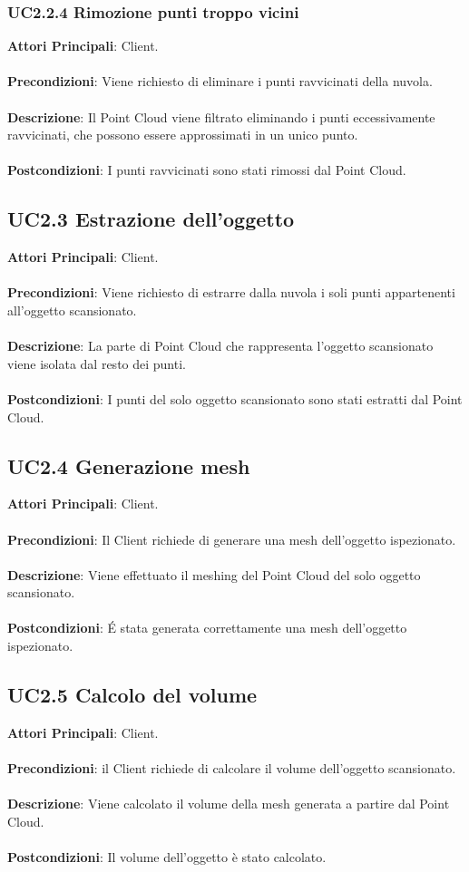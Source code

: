 \subsubsection{UC2.2.4 Rimozione punti troppo vicini}
\textbf{Attori Principali}: Client.
\\\\ \textbf{Precondizioni}: Viene richiesto di eliminare i punti ravvicinati della nuvola.
\\\\ \textbf{Descrizione}: Il Point Cloud viene filtrato eliminando i punti eccessivamente ravvicinati, che possono essere approssimati in un unico punto.
\\\\ \textbf{Postcondizioni}: I punti ravvicinati sono stati rimossi dal Point Cloud.

\subsection{UC2.3 Estrazione dell'oggetto}
\textbf{Attori Principali}: Client.
\\\\ \textbf{Precondizioni}: Viene richiesto di estrarre dalla nuvola i soli punti appartenenti all'oggetto scansionato.
\\\\ \textbf{Descrizione}: La parte di Point Cloud che rappresenta l'oggetto scansionato viene isolata dal resto dei punti.
\\\\ \textbf{Postcondizioni}: I punti del solo oggetto scansionato sono stati estratti dal Point Cloud.

\subsection{UC2.4 Generazione mesh}
\textbf{Attori Principali}: Client.
\\\\ \textbf{Precondizioni}: Il Client richiede di generare una mesh dell'oggetto ispezionato.
\\\\ \textbf{Descrizione}: Viene effettuato il meshing del Point Cloud del solo oggetto scansionato.
\\\\ \textbf{Postcondizioni}: \'E stata generata correttamente una mesh dell'oggetto ispezionato.

\subsection{UC2.5 Calcolo del volume}
\textbf{Attori Principali}: Client.
\\\\ \textbf{Precondizioni}: il Client richiede di calcolare il volume dell'oggetto scansionato.
\\\\ \textbf{Descrizione}: Viene calcolato il volume della mesh generata a partire dal Point Cloud.
\\\\ \textbf{Postcondizioni}: Il volume dell'oggetto è stato calcolato.

